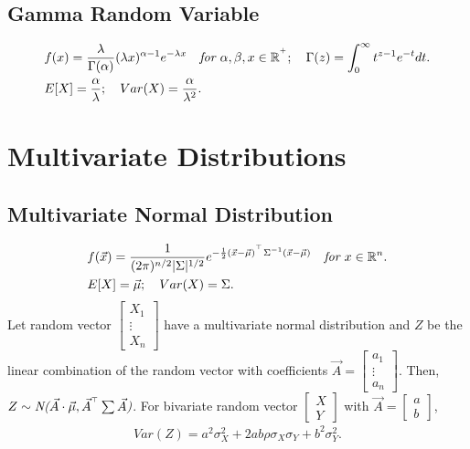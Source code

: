 \documentclass{article}
\begin{document}
\subsection{Gamma Random Variable}
\begin{align*}
    & f(x) = \frac{\lambda}{\Gamma(\alpha)} (\lambda x)^{\alpha-1} e^{-\lambda x} \quad \emph{for $\alpha, \beta, x\in \mathbb{R}^{^+}$}; \quad \Gamma(z) = \int_0^\infty t^{z-1}e^{-t}dt. \\
    & E[X] = \frac{\alpha}{\lambda}; \quad Var(X) = \frac{\alpha}{\lambda^2}.
\end{align*}

\newpage
\section{Multivariate Distributions}
\subsection{Multivariate Normal Distribution}
\begin{align*}
    & f(\vec{x}) = \frac{1}{(2\pi)^{n/2}|\Sigma|^{1/2}} e^{-\frac{1}{2}(\vec{x}-\vec{\mu})^{^\top}\Sigma^{-1}(\vec{x}-\vec{\mu})} \quad \emph{for $x\in \mathbb{R}^n$}. \\
    & E[X] = \vec{\mu}; \quad Var(X) = \Sigma.
\end{align*}
Let random vector $\begin{bmatrix} X_1 \\ \vdots \\ X_n \end{bmatrix}$ have a multivariate normal distribution and $Z$ be the linear combination of the random vector with coefficients $\vec{A} = \begin{bmatrix}
    a_1 \\ 
    \vdots \\
    a_n
\end{bmatrix}$.
Then, $Z\sim \emph{N($\vec{A}\cdot \vec{\mu},\vec{A}^{^\top}\sum\vec{A}$)}$.
For bivariate random vector $\begin{bmatrix}
    X \\ Y
\end{bmatrix}$ with $\vec{A} = \begin{bmatrix}
    a \\ b
\end{bmatrix}$,
\begin{align*}
    Var(Z) = a^2\sigma_X^2+2ab\rho\sigma_X\sigma_Y+b^2\sigma_Y^2.
\end{align*}
\end{document}
